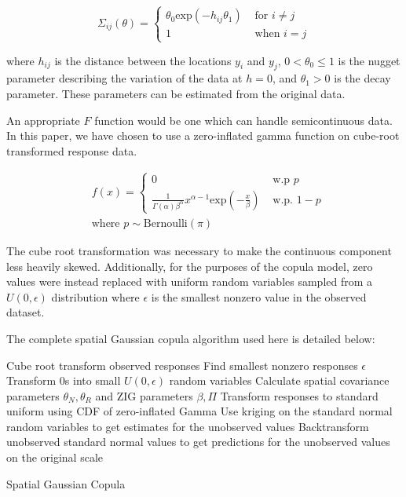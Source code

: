 \documentclass{article}
\begin{document}
$$
\Sigma_{ij}(\theta) = 
	\begin{cases}
		\theta_0 \text{exp}(-h_{ij} \theta_1) & \text{ for } i \neq j\\
		1 & \text{ when } i = j
	\end{cases}
$$

where $h_{ij}$ is the distance between the locations $y_i$ and $y_j$, $0 < \theta_0 \leq 1$ is the nugget parameter describing the variation of the data at $h = 0$, and $\theta_1 > 0$ is the decay parameter.
These parameters can be estimated from the original data.

An appropriate $F$ function would be one which can handle semicontinuous data.
In this paper, we have chosen to use a zero-inflated gamma function on cube-root transformed response data.

\begin{align*}
&f(x) = 
\begin{cases}
	0 & \text{ w.p } p \\
	\frac{1}{\Gamma(\alpha) \beta^\alpha} x^{\alpha -1} \text{exp}\left(-\frac{x}{\beta}\right) & \text{ w.p. } 1 - p 
\end{cases} 
\\
&\text{where } p \sim \text{Bernoulli}(\pi)
\end{align*}

The cube root transformation was necessary to make the continuous component less heavily skewed.
Additionally, for the purposes of the copula model, zero values were instead replaced with uniform random variables sampled from a $U(0, \epsilon)$ distribution where $\epsilon$ is the smallest nonzero value in the observed dataset.

The complete spatial Gaussian copula algorithm used here is detailed below:

\begin{algorithm}[H]
\SetAlgoLined
{}
 {
	Cube root transform observed responses\; 
	Find smallest nonzero responses $\epsilon$ \;
	Transform 0s into small $U(0, \epsilon)$ random variables\;
	Calculate spatial covariance parameters $\theta_N, \theta_R$ and ZIG parameters $\beta, \Pi$\;
	Transform responses to standard uniform using CDF of zero-inflated Gamma\; 
	Use kriging on the standard normal random variables to get estimates for the unobserved values \;
	Backtransform unobserved standard normal values to get predictions for the unobserved values on the original scale\; 
}
	\caption{Spatial Gaussian Copula}
\end{algorithm}
\end{document}
